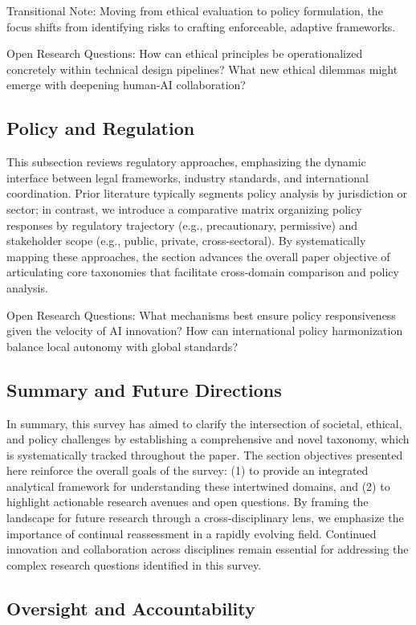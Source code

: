 \documentclass[sigconf]{acmart}
\begin{document}
Transitional Note: Moving from ethical evaluation to policy formulation, the focus shifts from identifying risks to crafting enforceable, adaptive frameworks.

Open Research Questions: How can ethical principles be operationalized concretely within technical design pipelines? What new ethical dilemmas might emerge with deepening human-AI collaboration?

\subsection{Policy and Regulation}
This subsection reviews regulatory approaches, emphasizing the dynamic interface between legal frameworks, industry standards, and international coordination. Prior literature typically segments policy analysis by jurisdiction or sector; in contrast, we introduce a comparative matrix organizing policy responses by regulatory trajectory (e.g., precautionary, permissive) and stakeholder scope (e.g., public, private, cross-sectoral). By systematically mapping these approaches, the section advances the overall paper objective of articulating core taxonomies that facilitate cross-domain comparison and policy analysis.

Open Research Questions: What mechanisms best ensure policy responsiveness given the velocity of AI innovation? How can international policy harmonization balance local autonomy with global standards?

\subsection{Summary and Future Directions}
In summary, this survey has aimed to clarify the intersection of societal, ethical, and policy challenges by establishing a comprehensive and novel taxonomy, which is systematically tracked throughout the paper. The section objectives presented here reinforce the overall goals of the survey: (1) to provide an integrated analytical framework for understanding these intertwined domains, and (2) to highlight actionable research avenues and open questions. By framing the landscape for future research through a cross-disciplinary lens, we emphasize the importance of continual reassessment in a rapidly evolving field. Continued innovation and collaboration across disciplines remain essential for addressing the complex research questions identified in this survey.

\subsection{Oversight and Accountability}
\end{document}
